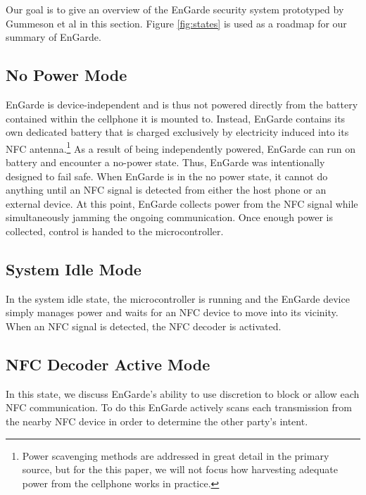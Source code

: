 \documentclass{sig-alternate}
\begin{document}
Our goal is to give an overview of the EnGarde security system prototyped by Gummeson et al in this section. Figure \ref{fig:states} is used as a roadmap for our summary of EnGarde.

\subsection{No Power Mode}

EnGarde is device-independent and is thus not powered directly from the battery contained within the cellphone it is mounted to. Instead, EnGarde contains its own dedicated battery that is charged exclusively by electricity induced into its NFC antenna.\footnote{Power scavenging methods are addressed in great detail in the primary source, but for the this paper, we will not focus how harvesting adequate power from the cellphone works in practice.}
As a result of being independently powered, EnGarde can run on battery and encounter a no-power state. Thus, EnGarde was intentionally designed to fail safe. When EnGarde is in the no power state, it cannot do anything until an NFC signal is detected from either the host phone or an external device. At this point, EnGarde collects power from the NFC signal while simultaneously jamming the ongoing communication. Once enough power is collected, control is handed to the microcontroller.

\subsection{System Idle Mode}
In the system idle state, the microcontroller is running and the EnGarde device simply manages power and waits for an NFC device to move into its vicinity. When an NFC signal is detected, the NFC decoder is activated.

\subsection{NFC Decoder Active Mode}
In this state, we discuss EnGarde's ability to use discretion to block or allow each NFC communication. To do this EnGarde actively scans each transmission from the nearby NFC device in order to determine the other party's intent.
\end{document}
